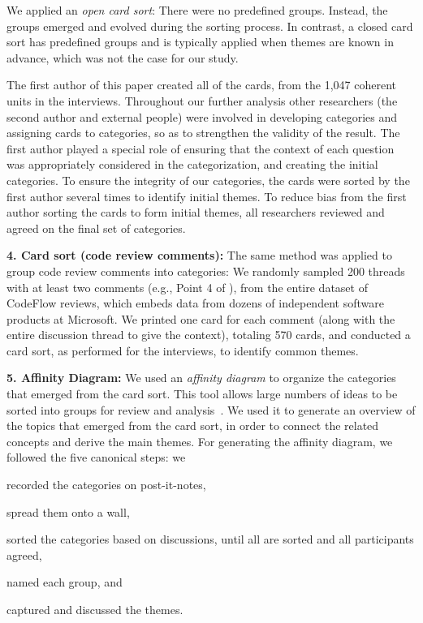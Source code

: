 We applied an \emph{open card sort}: There were no predefined groups. Instead, the
groups emerged and evolved during the sorting process. In contrast, a closed
card sort has predefined groups and is typically applied when themes are known
in advance, which was not the case for our study.

The first author of this paper created all of the cards, from the 1,047
coherent units in the interviews. Throughout our further analysis other
researchers (the second author and external people) were involved in developing
categories and assigning cards to categories, so as to strengthen the validity
of the result. The first author played a special role of ensuring that the
context of each question was appropriately considered in the categorization,
and creating the initial categories. To ensure the integrity of our categories,
the cards were sorted by the first author several times to identify initial
themes. To reduce bias from the first author sorting the cards to form initial themes, all researchers reviewed and agreed on the final set of
categories.

\textbf{4. Card sort (code review comments):} The same method was applied to group code
review comments into categories: We randomly sampled 200 threads with at least
two comments (e.g., Point 4 of ), from the entire dataset of CodeFlow
reviews, which embeds data from dozens of independent software products at
Microsoft. We printed one card for each comment (along with the entire
discussion thread to give the context), totaling 570 cards, and conducted a
card sort, as performed for the interviews, to identify common themes.

\textbf{5. Affinity Diagram:} We used an \emph{affinity diagram} to organize the categories
that emerged from the card sort. This tool allows large numbers of ideas to be
sorted into groups for review and analysis~\cite{shade2000improving}. We used it
to generate an overview of the topics that emerged from the card sort, in order
to connect the related concepts and derive the main themes. For generating the
affinity diagram, we followed the five canonical steps: we \begin{inparaenum}[(1)] 
\item recorded the categories on post-it-notes, 
\item spread them onto a wall, 
\item sorted the categories based on discussions, until all are sorted and all participants agreed, 
\item named each group, and 
\item captured and discussed the themes.
\end{inparaenum}


